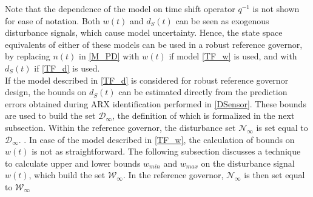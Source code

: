 \documentclass[letterpaper, 10 pt, conference]{ieeeconf}  %
\begin{document}
	Note that the dependence of the model on time shift operator $q^{-1}$ is not shown for ease of notation. Both $w(t)$ and $d_S(t)$ can be seen as exogenous disturbance signals, which cause model uncertainty. Hence, the state space equivalents of either of these models can be used in a robust reference governor, by replacing $n(t)$ in \eqref{M_PD} with $w(t)$ if model \eqref{TF_w} is used, and with $d_S(t)$ if \eqref{TF_d} is used. \\
	If the model described in \eqref{TF_d} is considered for robust reference governor design, the bounds on $d_S(t)$ can be estimated directly from the prediction errors obtained during ARX identification performed in \eqref{DSensor}. These bounds are used to build the set $\mathcal{D}_{\infty}$, the definition of which is formalized in the next subsection. Within the reference governor, the disturbance set $\mathcal{N}_{\infty}$ is set equal to $\mathcal{D}_{\infty}$.
.	In case of the model described in \eqref{TF_w}, the calculation of bounds on $w(t)$ is not as straightforward. 
	The following subsection discusses a technique to calculate upper and lower bounds $w_{min}$ and $w_{max}$ on the disturbance signal $w(t)$, which build the set $\mathcal{W}_{\infty}$. In the reference governor, $\mathcal{N}_{\infty}$ is then set equal to $\mathcal{W}_{\infty}$
\end{document}
